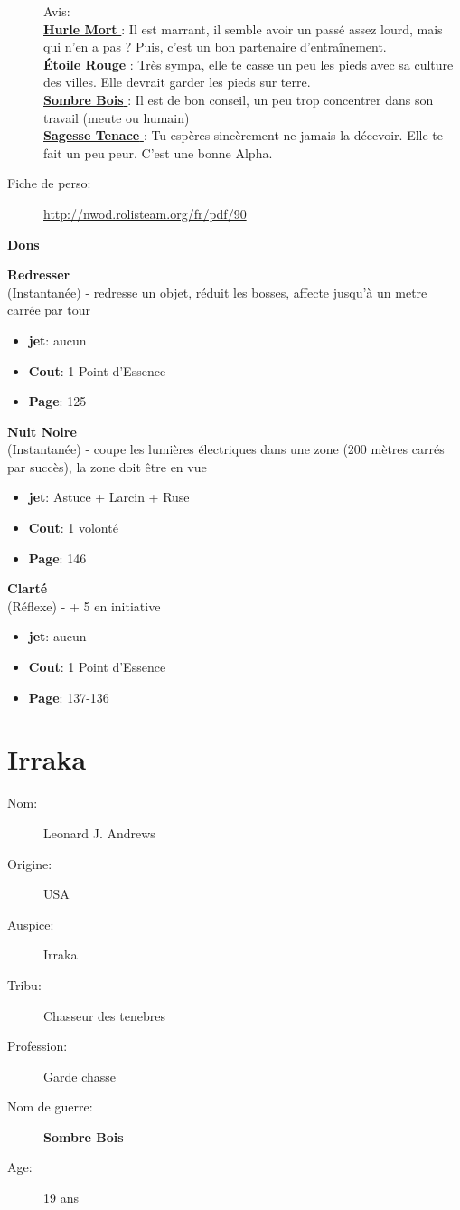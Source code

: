 \documentclass[oneside,12pt]{book}
\newcommand\don[6]{
\textbf{#1} \\
(#6) - #2
\begin{itemize}
\item{ \textbf{jet}: #3}
\item{ \textbf{Cout}: #4}
\item{ \textbf{Page}: #5}
\end{itemize}
\vspace{0.5cm}
}
\newcommand{\Lynn}{\textbf{Étoile Rouge} }
\newcommand{\Jessica}{\textbf{Sagesse Tenace} }
\newcommand{\Peter}{\textbf{Hurle Mort} }
\newcommand{\Leonard}{\textbf{Sombre Bois} }
\begin{document}
\begin{flushleft}
\begin{description}
{Avis:\\
\underline{\Peter} : Il est marrant, il semble avoir un passé assez lourd, mais qui n'en a pas ? Puis, c'est un bon partenaire d’entraînement. \\
\underline{\Lynn}: Très sympa, elle te casse un peu les pieds avec sa culture des villes. Elle devrait garder les pieds sur terre.\\
\underline{\Leonard} : Il est de bon conseil, un peu trop concentrer dans son travail (meute ou humain)\\
\underline{\Jessica}: Tu espères sincèrement ne jamais la décevoir. Elle te fait un peu peur. C'est une bonne Alpha.\\
}
\item[Fiche de perso:]{\href{http://nwod.rolisteam.org/fr/pdf/90}{http://nwod.rolisteam.org/fr/pdf/90}}
\end{description}
\clearpage
\textbf{\large Dons} 
\vspace{0.5cm}


\don{Redresser}{redresse un objet, réduit les bosses, affecte jusqu'à un metre carrée par tour}{aucun}{1 Point d'Essence}{125}{Instantanée}
\don{Nuit Noire}{coupe les lumières électriques dans une zone (200 mètres carrés par succès), la zone doit être en vue}{Astuce + Larcin + Ruse}{1 volonté}{146}{Instantanée}
\don{Clarté}{+ 5 en initiative}{aucun}{1 Point d'Essence}{137-136}{Réflexe}

\clearpage
\section{Irraka}
\begin{description}
\item[Nom:]{Leonard J. Andrews}
\item[Origine:]{USA}
\item[Auspice:]{Irraka}
\item[Tribu:]{Chasseur des tenebres}
\item[Profession:]{Garde chasse}
\item[Nom de guerre:]{\Leonard}
\item[Age:]{19 ans}


\end{description}
\end{flushleft}
\end{document}
